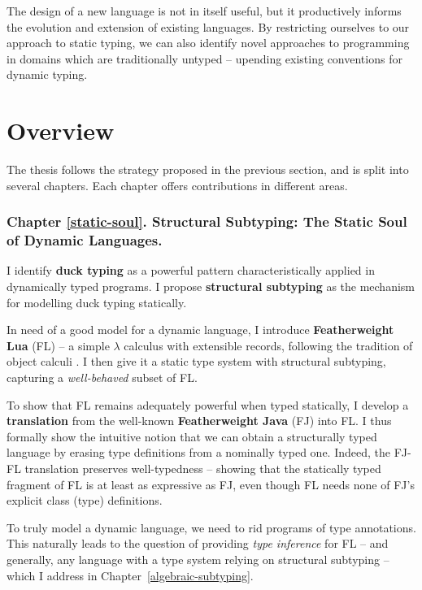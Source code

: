 The design of a new language is not in itself useful, but it productively informs the evolution and extension of existing languages.
By restricting ourselves to our approach to static typing, we can also identify novel approaches to programming in domains which are traditionally untyped -- upending existing conventions for dynamic typing. 

\section{Overview}

The thesis follows the strategy proposed in the previous section, and is split into several chapters. Each chapter offers contributions in different areas.

\subsubsection{Chapter \ref{static-soul}. Structural Subtyping: The Static Soul of Dynamic Languages.} 

I identify \textbf{duck typing} as a powerful pattern characteristically applied in dynamically typed programs. I propose \textbf{structural subtyping} as the mechanism for modelling duck typing statically. 

In need of a good model for a dynamic language, I introduce \textbf{Featherweight Lua} (FL) -- a simple $\lambda$ calculus with extensible records, following the tradition of object calculi \cite{abadi-cardelli-object-calculus}. I then give it a static type system with structural subtyping, capturing a \emph{well-behaved} subset of FL.

To show that FL remains adequately powerful when typed statically, I develop a \textbf{translation} from the well-known \textbf{Featherweight Java} (FJ) \cite{featherweight-java} into FL. 
I thus formally show the intuitive notion that we can obtain a structurally typed language by erasing type definitions from a nominally typed one.
Indeed, the FJ-FL translation preserves well-typedness -- showing that the statically typed fragment of FL is at least as expressive as FJ, even though FL needs none of FJ's explicit class (type) definitions. 

To truly model a dynamic language, we need to rid programs of type annotations. This naturally leads to the question of providing \emph{type inference} for FL -- and generally, any language with a type system relying on structural subtyping -- which I address in Chapter~\ref{algebraic-subtyping}.


